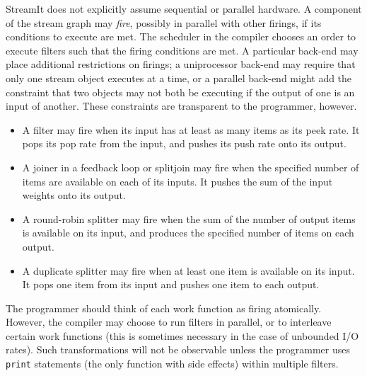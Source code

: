 \documentclass[11pt]{article}
\begin{document}
StreamIt does not explicitly assume sequential or parallel hardware.
A component of the stream graph may \emph{fire}, possibly in parallel
with other firings, if its conditions to execute are met.  The
scheduler in the compiler chooses an order to execute filters such
that the firing conditions are met.  A particular back-end may place
additional restrictions on firings; a uniprocessor back-end may
require that only one stream object executes at a time, or a parallel
back-end might add the constraint that two objects may not both be
executing if the output of one is an input of another.  These
constraints are transparent to the programmer, however.

\begin{itemize}
\item A filter may fire when its input has at least as many items as
  its peek rate.
  It pops its pop rate from the input, and pushes its push rate onto
  its output.
\item A joiner in a feedback loop or splitjoin may fire when the
  specified number of items are available on each of its inputs.  It
  pushes the sum of the input weights onto its output.
\item A round-robin splitter may fire when the sum of the number of
  output items is available on its input, and produces the specified
  number of items on each output.
\item A duplicate splitter may fire when at least one item is
  available on its input.  It pops one item from its input and pushes
  one item to each output.
\end{itemize}

The programmer should think of each work function as firing
atomically.  However, the compiler may choose to run filters in
parallel, or to interleave certain work functions (this is sometimes
necessary in the case of unbounded I/O rates).  Such transformations
will not be observable unless the programmer uses \lstinline|print|
statements (the only function with side effects) within multiple
filters.
\end{document}
